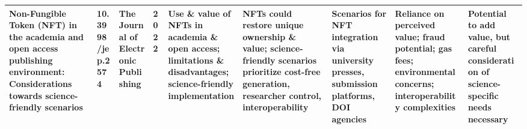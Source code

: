 \documentclass{article}
\begin{document}
\begin{landscape}
\begin{table}[ht]
\begin{tabularx}{\linewidth}{|p{3.5cm}|p{2.5cm}|p{3cm}|p{1.8cm}|X|X|X|X|X|}
            \hline
            Non-Fungible Token (NFT) in the academia and open access publishing environment: Considerations towards science-friendly scenarios & 10.3998/jep.2574              & The Journal of Electronic Publishing                           & 2022                      & Use \& value of NFTs in academia \& open access; limitations \& disadvantages; science-friendly implementation              & NFTs could restore unique ownership \& value; science-friendly scenarios prioritize cost-free generation, researcher control, interoperability & Scenarios for NFT integration via university presses, submission platforms, DOI agencies                & Reliance on perceived value; fraud potential; gas fees; environmental concerns; interoperability complexities                       & Potential to add value, but careful consideration of science-specific needs necessary                 \\
            \hline
        \end{tabularx}
    \end{table}
\end{landscape}
\end{document}
